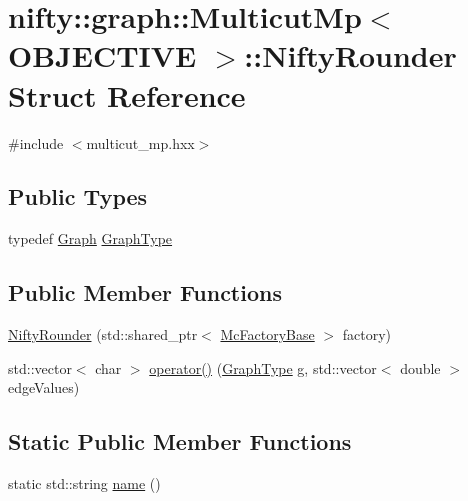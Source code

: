 \hypertarget{structnifty_1_1graph_1_1MulticutMp_1_1NiftyRounder}{}\section{nifty\+:\+:graph\+:\+:Multicut\+Mp$<$ O\+B\+J\+E\+C\+T\+I\+V\+E $>$\+:\+:Nifty\+Rounder Struct Reference}
\label{structnifty_1_1graph_1_1MulticutMp_1_1NiftyRounder}


{\ttfamily \#include $<$multicut\+\_\+mp.\+hxx$>$}

\subsection*{Public Types}
\begin{DoxyCompactItemize}
\item 
typedef \hyperlink{classnifty_1_1graph_1_1MulticutBase_aed98150a2206d8355fa06f9bda580fdc}{Graph} \hyperlink{structnifty_1_1graph_1_1MulticutMp_1_1NiftyRounder_adb3bd033f9414a998fd5145e78098f2d}{Graph\+Type}
\end{DoxyCompactItemize}
\subsection*{Public Member Functions}
\begin{DoxyCompactItemize}
\item 
\hyperlink{structnifty_1_1graph_1_1MulticutMp_1_1NiftyRounder_a0ec1d47bb1a3d18642cbbe7fff7923ea}{Nifty\+Rounder} (std\+::shared\+\_\+ptr$<$ \hyperlink{classnifty_1_1graph_1_1MulticutMp_a6da7773d133f8c60d195bf6bc42dddcd}{Mc\+Factory\+Base} $>$ factory)
\item 
std\+::vector$<$ char $>$ \hyperlink{structnifty_1_1graph_1_1MulticutMp_1_1NiftyRounder_ac3593f0a1f98289f07f15b84a90adbba}{operator()} (\hyperlink{structnifty_1_1graph_1_1MulticutMp_1_1NiftyRounder_adb3bd033f9414a998fd5145e78098f2d}{Graph\+Type} g, std\+::vector$<$ double $>$ edge\+Values)
\end{DoxyCompactItemize}
\subsection*{Static Public Member Functions}
\begin{DoxyCompactItemize}
\item 
static std\+::string \hyperlink{structnifty_1_1graph_1_1MulticutMp_1_1NiftyRounder_a595c2db5134a5045617b40d18db833d3}{name} ()
\end{DoxyCompactItemize}



